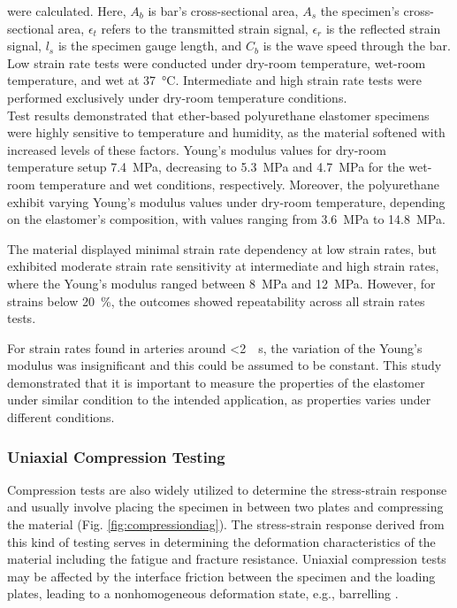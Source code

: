 were calculated. Here, $A_b$ is bar's cross-sectional area, $A_s$ the specimen's cross-sectional area,
$\epsilon_t$ refers to the transmitted strain signal, $\epsilon_r$ is the reflected strain signal,
$l_s$ is the specimen gauge length, and $C_b$ is the wave speed through the bar.
Low strain rate tests were conducted under dry-room temperature, wet-room temperature, and wet at \SI{37}{\degreeCelsius}. 
Intermediate and high strain rate tests were performed exclusively under dry-room temperature conditions.\\

Test results demonstrated that ether-based polyurethane elastomer specimens were highly sensitive to 
temperature and humidity, as the material softened with increased levels of these factors. Young's 
modulus values for dry-room temperature setup \SI{7.4}{\mega \pascal}, decreasing to \SI{5.3}{\mega \pascal} 
and \SI{4.7}{\mega \pascal} for the wet-room temperature and wet conditions, respectively.
Moreover, the polyurethane exhibit varying Young's modulus values under dry-room temperature, depending 
on the elastomer's composition, with values ranging from \SI{3.6}{\mega \pascal} to \SI{14.8}{\mega \pascal}.

The material displayed minimal strain rate dependency at low strain rates, but exhibited moderate 
strain rate sensitivity at intermediate and high strain rates, where the Young's modulus ranged between 
\SI{8}{\mega \pascal} and \SI{12}{\mega \pascal}. However, for strains below \SI{20}{\percent}, the 
outcomes showed repeatability across all strain rates tests. 

For strain rates found in arteries around \SI[per-mode = symbol]{<2}{\per \second}, the variation of the
Young's modulus was insignificant and this could be assumed to be constant. This study demonstrated 
that it is important to measure the properties of the elastomer under similar condition to the
intended application, as properties varies under different conditions.

\subsubsection*{Uniaxial Compression Testing}
Compression tests are also widely utilized to determine the stress-strain response and 
usually involve placing the specimen in between two plates and compressing the material (Fig. \ref{fig:compressiondiag}).
The stress-strain response derived from this kind of testing serves in determining the deformation 
characteristics of the material including the fatigue and fracture resistance. 
Uniaxial compression tests may be affected by the interface friction between the specimen and 
the loading plates, leading to a nonhomogeneous deformation state, e.g., barrelling \cite{Bergström2015}.\\

